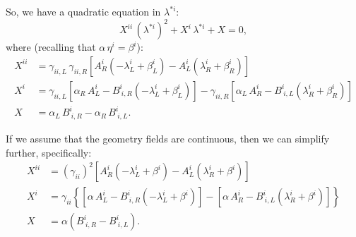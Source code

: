 \documentclass[10pt,preprint]{../aastex}
\begin{document}
So, we have a quadratic equation in $\lambda^{*i}$:
\begin{equation}
    X^{ii}\,\left(\lambda^{*i}\right)^{2}+X^{i}\,\lambda^{*i}+X=0,
\end{equation}
where (recalling that $\alpha\,\eta^{i}=\beta^{i}$):
\begin{align}
    X^{ii}&=\gamma_{ii,L}\,\gamma_{ii,R}\left[A^{i}_{R}\left(-\lambda^{i}_{L}+\beta^{i}_{L}\right)-A^{i}_{L}\left(\lambda^{i}_{R}+\beta^{i}_{R}\right)\right]\\
    X^{i}&=\gamma_{ii,L}\left[\alpha_{R}\,A^{i}_{L}-B^{i}_{~i,R}\left(-\lambda^{i}_{L}+\beta^{i}_{L}\right)\right]-\gamma_{ii,R}\left[\alpha_{L}\,A^{i}_{R}-B^{i}_{~i,L}\left(\lambda^{i}_{R}+\beta^{i}_{R}\right)\right]\\
    X&=\alpha_{L}\,B^{i}_{~i,R}-\alpha_{R}\,B^{i}_{~i,L}.
\end{align}

If we assume that the geometry fields are continuous, then we can simplify further, specifically:
\begin{align}
    X^{ii}&=\left(\gamma_{ii}\right)^{2}\left[A^{i}_{R}\left(-\lambda^{i}_{L}+\beta^{i}\right)-A^{i}_{L}\left(\lambda^{i}_{R}+\beta^{i}\right)\right]\\
    X^{i}&=\gamma_{ii}\left\{\left[\alpha\,A^{i}_{L}-B^{i}_{~i,R}\left(-\lambda^{i}_{L}+\beta^{i}\right)\right]-\left[\alpha\,A^{i}_{R}-B^{i}_{~i,L}\left(\lambda^{i}_{R}+\beta^{i}\right)\right]\right\}\\
    X&=\alpha\left(B^{i}_{~i,R}-B^{i}_{~i,L}\right).
\end{align}

\newpage


\end{document}
